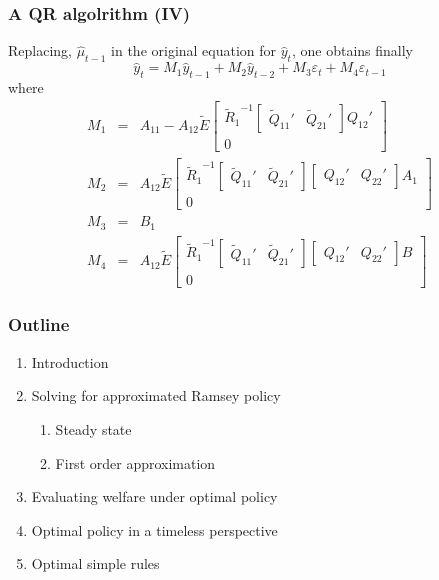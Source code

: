 \documentclass{beamer}
\begin{document}
\begin{frame}
  \frametitle{A QR algolrithm (IV)}

Replacing, $\widehat\mu_{t-1}$ in the original equation for $\widehat y_{t}$, one obtains finally
\[
\widehat y_t = M_1 \widehat y_{t-1} + M_2 \widehat y_{t-2}+M_3\varepsilon_t+M_4\varepsilon_{t-1}
\]
where
\begin{eqnarray*}
  M_1 &=& A_{11}-A_{12}\widetilde E\left[\begin{array}{c}{\widetilde R_1}^{-1}\left[
  \begin{array}{cc}
  \widetilde Q_{11}' & \widetilde Q_{21}'  
  \end{array}\right]Q_{12}'\\0\end{array}\right]\\
M_2 &=& A_{12}\widetilde E\left[\begin{array}{c}{\widetilde R_1}^{-1}\left[
  \begin{array}{cc}
  \widetilde Q_{11}' & \widetilde Q_{21}'  
  \end{array}\right]\left[
      \begin{array}{cc}Q_{12}' & Q_{22}'\end{array}\right]A_1\\0\end{array}\right]\\
M_3 &=& B_1 \\
M_4 &=& A_{12}\widetilde E\left[\begin{array}{c}{\widetilde R_1}^{-1}\left[
  \begin{array}{cc}
  \widetilde Q_{11}' & \widetilde Q_{21}'  
  \end{array}\right]\left[
      \begin{array}{cc}Q_{12}' & Q_{22}'\end{array}\right]B \\0\end{array}\right]
\end{eqnarray*}

\end{frame}

\begin{frame}
  \frametitle{Outline}
  \begin{enumerate}
  \item Introduction
  \item Solving for approximated Ramsey policy
    \begin{enumerate}
    \item Steady state
    \item First order approximation
    \end{enumerate}
  \item Evaluating welfare under optimal policy
  \item Optimal policy in a timeless perspective
  \item {\red Optimal simple rules}
  \end{enumerate}
\end{frame}
\end{document}
